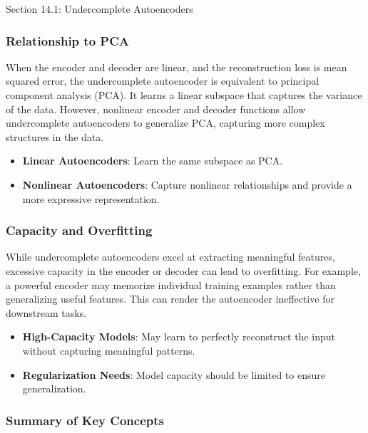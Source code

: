 \begin{notes}{Section 14.1: Undercomplete Autoencoders}
    \subsubsection*{Relationship to PCA}
    
    When the encoder and decoder are linear, and the reconstruction loss is mean squared error, the undercomplete autoencoder is equivalent to principal component analysis (PCA). It learns a linear 
    subspace that captures the variance of the data. However, nonlinear encoder and decoder functions allow undercomplete autoencoders to generalize PCA, capturing more complex structures in the data.
    
    \begin{highlight}
        \begin{itemize}
            \item \textbf{Linear Autoencoders}: Learn the same subspace as PCA.
            \item \textbf{Nonlinear Autoencoders}: Capture nonlinear relationships and provide a more expressive representation.
        \end{itemize}
    \end{highlight}
    
    \subsubsection*{Capacity and Overfitting}
    
    While undercomplete autoencoders excel at extracting meaningful features, excessive capacity in the encoder or decoder can lead to overfitting. For example, a powerful encoder may memorize individual 
    training examples rather than generalizing useful features. This can render the autoencoder ineffective for downstream tasks.
    
    \begin{highlight}
        \begin{itemize}
            \item \textbf{High-Capacity Models}: May learn to perfectly reconstruct the input without capturing meaningful patterns.
            \item \textbf{Regularization Needs}: Model capacity should be limited to ensure generalization.
        \end{itemize}
    \end{highlight}
    
    \subsubsection*{Summary of Key Concepts}
    

\end{notes}
